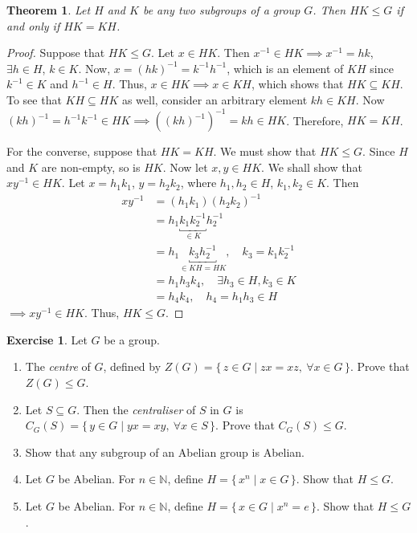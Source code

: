 \documentclass[svgnames]{article}
\newtheorem{Theorem}{Theorem}[section]
\theoremstyle{definition}
\newtheorem{Exercise}{Exercise}[section]
\theoremstyle{remark}
\begin{document}
\begin{Theorem}\label{thm:HK}
Let $H$ and $K$ be any two subgroups of a group $G$. Then $HK \le G$ if and only if $HK = KH$.
\end{Theorem}
\begin{proof}
Suppose that $HK \le G$. Let $x \in HK$. Then $x^{-1} \in HK \implies x^{-1} = hk$, $\exists h \in H$, $k \in K$. Now, $x = (hk)^{-1} = k^{-1} h^{-1}$, which is an element of $KH$ since $k^{-1} \in K$ and $h^{-1} \in H$. Thus, $x \in HK \implies x \in KH$, which shows that $HK \subseteq KH$. To see that $KH \subseteq HK$ as well, consider an arbitrary element $kh \in KH$. Now $(kh)^{-1} = h^{-1}k^{-1} \in HK \implies ((kh)^{-1})^{-1} = kh \in HK$.  Therefore, $HK = KH$.

For the converse, suppose that $HK = KH$. We must show that $HK \le G$. Since $H$ and $K$ are non-empty, so is $HK$. Now let $x, y \in HK$. We shall show that $xy^{-1} \in HK$. Let $x = h_1 k_1$, $y = h_2 k_2$, where $h_1, h_2 \in H$, $k_1, k_2 \in K$. Then
\begin{align*}
xy^{-1} & = (h_1k_1)(h_2k_2)^{-1}\\
	& = h_1 \underbracket{k_1 k_2^{-1}}_{\in K} h_2^{-1}\\
	& = h_1 \underbracket{k_3 h_2^{-1}}_{\in KH = HK}, \quad k_3 = k_1 k_2^{-1}\\
	& = h_1 h_3 k_4, \quad \exists h_3 \in H, k_3 \in K\\
	&= h_4 k_4, \quad h_4 = h_1 h_3 \in H
\end{align*}
$\implies xy^{-1} \in HK$. Thus, $HK \le G$.
\end{proof}
\begin{Exercise}
Let $G$ be a group.
\begin{enumerate}
\item The \emph{centre}\label{def:Centre} of $G$, defined by $Z(G) = \{\, z \in G \mid zx = xz,\ \forall x \in G \,\}$. Prove that $Z(G) \le G$.
\item Let $S \subseteq G$. Then the \emph{centraliser}\label{def:Centraliser} of $S$ in $G$ is $C_G(S) = \{\, y \in G \mid yx = xy,\ \forall x \in S \,\}$. Prove that $C_G(S) \le G$.
\item Show that any subgroup of an Abelian group is Abelian.
\item Let $G$ be Abelian. For $n \in \mathbb N$, define $H = \{\, x^n \mid x \in G \,\}$. Show that $H \le G$.
\item Let $G$ be Abelian. For $n \in \mathbb N$, define $H = \{\,  x \in G \mid x^n = e\,\}$. Show that $H \le G$.
\end{enumerate}
\end{Exercise}
\end{document}
